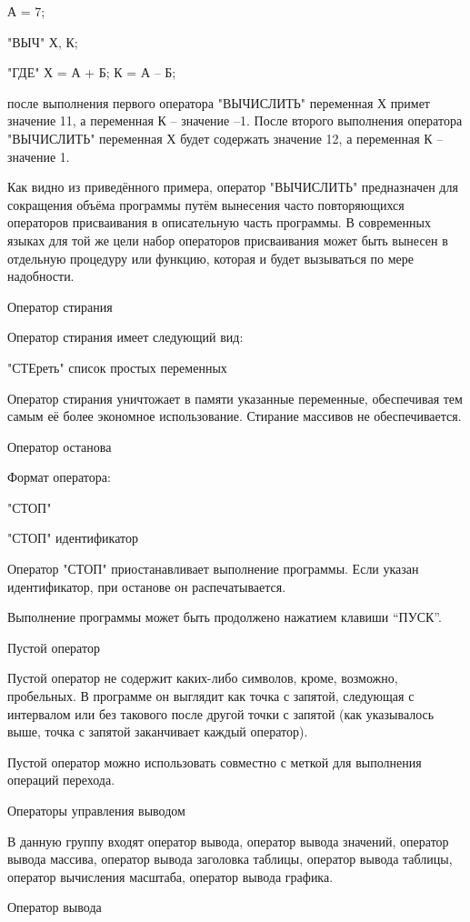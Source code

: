 \documentclass[11pt]{article}
\begin{document}
А = 7;

"ВЫЧ" Х, К;

"ГДЕ" Х = А + Б; К = А – Б;

после выполнения первого оператора
"ВЫЧИСЛИТЬ" переменная Х примет
значение 11, а переменная К – значение
–1. После второго выполнения оператора
"ВЫЧИСЛИТЬ" переменная Х будет
содержать значение 12, а переменная К –
значение 1.

Как видно из приведённого примера,
оператор "ВЫЧИСЛИТЬ" предназначен для
сокращения объёма программы путём
вынесения часто повторяющихся
операторов присваивания в
описательную часть программы. В
современных языках для той же цели
набор операторов присваивания может
быть вынесен в отдельную процедуру или
функцию, которая и будет вызываться по
мере надобности.

Оператор стирания

Оператор стирания имеет следующий вид:

"СТЕреть" список простых переменных

Оператор стирания уничтожает в памяти
указанные переменные, обеспечивая тем
самым её более экономное
использование. Стирание массивов не
обеспечивается.

Оператор останова

Формат оператора:

"СТОП"

"СТОП" идентификатор

Оператор "СТОП" приостанавливает
выполнение программы. Если указан
идентификатор, при останове он
распечатывается.

Выполнение программы может быть
продолжено нажатием клавиши “ПУСК”.

Пустой оператор

Пустой оператор не содержит каких-либо
символов, кроме, возможно, пробельных. В
программе он выглядит как точка с
запятой, следующая с интервалом или без
такового после другой точки с запятой
(как указывалось выше, точка с запятой
заканчивает каждый оператор).

Пустой оператор можно использовать
совместно с меткой для выполнения
операций перехода.

Операторы управления выводом

В данную группу входят оператор вывода,
оператор вывода значений, оператор
вывода массива, оператор вывода
заголовка таблицы, оператор вывода
таблицы, оператор вычисления масштаба,
оператор вывода графика.

Оператор вывода
\end{document}
